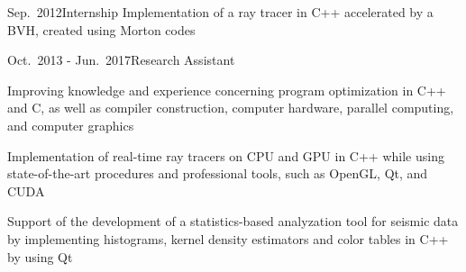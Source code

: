 \documentclass[a4paper,10pt]{cv}
\begin{document}

  \bigskip
      \begin{cvTimeItem}{Sep.~2012}{Internship}
        Implementation of a ray tracer in C++ accelerated by a BVH, created using Morton codes
      \end{cvTimeItem}
      \begin{cvTimeItem}{Oct.~2013 - Jun.~2017}{Research Assistant}
        \begin{cvItemize}
          \item Improving knowledge and experience concerning program optimization in C++ and C, as well as compiler construction, computer hardware, parallel computing, and computer graphics
          \item Implementation of real-time ray tracers on CPU and GPU in C++ while using state-of-the-art procedures and professional tools, such as OpenGL, Qt, and CUDA
          \item Support of the development of a statistics-based analyzation tool for seismic data by implementing histograms, kernel density estimators and color tables in C++ by using Qt
        \end{cvItemize}
      \end{cvTimeItem}
\end{document}
